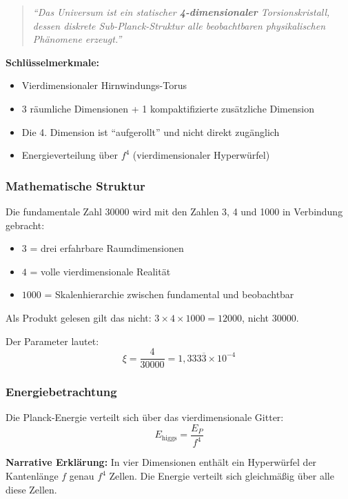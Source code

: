 	\begin{quote}
		\textit{\enquote{Das Universum ist ein statischer \textbf{4-dimensionaler} Torsionskristall, dessen diskrete Sub-Planck-Struktur alle beobachtbaren physikalischen Phänomene erzeugt.}}
	\end{quote}
	
	\textbf{Schlüsselmerkmale:}
	\begin{itemize}
		\item Vierdimensionaler Hirnwindungs-Torus
		\item 3 räumliche Dimensionen + 1 kompaktifizierte zusätzliche Dimension
		\item Die 4. Dimension ist \enquote{aufgerollt} und nicht direkt zugänglich
		\item Energieverteilung über $f^4$ (vierdimensionaler Hyperwürfel)
	\end{itemize}
	
	\subsubsection{Mathematische Struktur}
	
	Die fundamentale Zahl 30000 wird mit den Zahlen 3, 4 und 1000 in Verbindung gebracht:
	\begin{itemize}
		\item $3$ = drei erfahrbare Raumdimensionen
		\item $4$ = volle vierdimensionale Realität
		\item $1000$ = Skalenhierarchie zwischen fundamental und beobachtbar
	\end{itemize}
	Als Produkt gelesen gilt das nicht: $3 \times 4 \times 1000 = 12000$, nicht $30000$.
	
	Der Parameter lautet:
	\begin{equation}
		\boxed{\xi = \frac{4}{30000} = 1{,}333\overline{3} \times 10^{-4}}
	\end{equation}
	
	\subsubsection{Energiebetrachtung}
	
	Die Planck-Energie verteilt sich über das vierdimensionale Gitter:
	\begin{equation}
		E_{\text{higgs}} = \frac{E_P}{f^4}
	\end{equation}
	
	\textbf{Narrative Erklärung:} In vier Dimensionen enthält ein Hyperwürfel der Kantenlänge $f$ genau $f^4$ Zellen. Die Energie verteilt sich gleichmäßig über alle diese Zellen.
	
